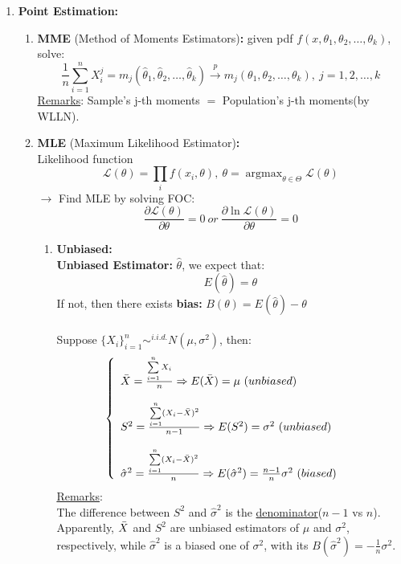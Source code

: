 \documentclass[a4paper,12pt]{article} %
\begin{document}
\begin{enumerate}
\item {{\bf Point Estimation:}
\begin{enumerate}
    \item {{\bf MME} (Method of Moments Estimators){\bf :} given pdf $f(x,\theta_1,\theta_2,\dots,\theta_k)$, solve: $$\frac{1}{n}\sum\limits_{i=1}^nX_i^j = m_j(\hat{\theta}_1,\hat{\theta}_2,\dots,\hat{\theta}_k)\xrightarrow{p} m_j(\theta_1,\theta_2,\dots,\theta_k),\ j=1,2,\dots,k $$ \underline{Remarks}: Sample's j-th moments $=$ Population's j-th moments(by WLLN). 
    }
    \item {{\bf MLE} (Maximum Likelihood Estimator){\bf :}\\ Likelihood function $$\mathcal{L}(\theta)=\prod\limits_if(x_i,\theta),\ \theta=\mathop{\arg\max}_{\theta\in\Theta}\mathcal{L}(\theta)  $$ $\rightarrow$ Find MLE by solving FOC: $$\frac{\partial\mathcal{L}(\theta)}{\partial\theta}=0\ or\  \frac{\partial\ln\mathcal{L}(\theta)}{\partial\theta}=0$$
    \begin{enumerate}
        \item {{\bf Unbiased:} \\ {\bf Unbiased Estimator:} $\hat{\theta}$, we expect that: $$ E(\hat{\theta})=\theta $$ If not, then there exists {\bf bias:} $B(\theta)=E(\hat{\theta})-\theta$ \\\\
        Suppose $\{X_i\}_{i=1}^n \sim^{i.i.d.}N(\mu, \sigma^2)$, then:
        \begin{equation}
        \left \{
        \begin{array}{lr} 
        \Bar{X} = \frac{\sum\limits_{i=1}^n X_i}{n} \Rightarrow E(\Bar{X})=\mu\ (unbiased) & \\\\ S^2=\frac{\sum\limits_{i=1}^n (X_i-\Bar{X})^2}{n-1} \Rightarrow E(S^2)=\sigma^2\ (unbiased) & \\\\ \hat{\sigma}^2=\frac{\sum\limits_{i=1}^n (X_i-\Bar{X})^2}{n} \Rightarrow E(\hat{\sigma}^2)=\frac{n-1}{n}\sigma^2\ (biased) &
        \end{array}\right.
        \end{equation}
        \underline{Remarks}: \\The difference between $S^2$ and $\hat{\sigma}^2$ is the \underline{denominator}($n-1$ vs $n$). Apparently, $\Bar{X}$ and $S^2$ are unbiased estimators of $\mu$ and $\sigma^2$, respectively, while $\hat{\sigma}^2$ is a biased one of $\sigma^2$, with its $B(\hat{\sigma}^2)=-\frac{1}{n}\sigma^2$.
}
\end{enumerate}}
\end{enumerate}}
\end{enumerate}
\end{document}
